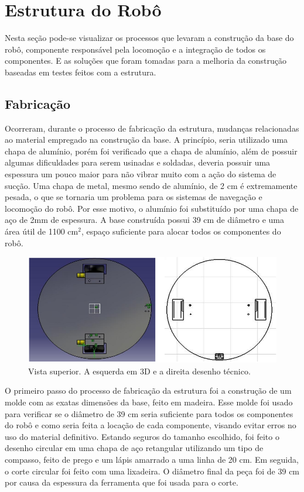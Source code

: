 
\section{Estrutura do Robô} %
\label{sec:estrutura_do_robô}

Nesta seção pode-se visualizar os processos que levaram a construção da base do robô, componente responsável pela locomoção e a integração de todos os componentes. E as soluções que foram tomadas para a melhoria da construção baseadas em testes feitos com a estrutura.

\subsection{Fabricação}

Ocorreram, durante o processo de fabricação da estrutura, mudanças relacionadas ao material empregado na construção da base. A princípio, seria utilizado uma chapa de alumínio, porém foi verificado que a chapa de alumínio, além de possuir algumas dificuldades para serem usinadas e soldadas, deveria possuir uma espessura um pouco maior para não vibrar muito com a ação do sistema de sucção. Uma chapa de metal, mesmo sendo de alumínio, de 2 cm é extremamente pesada, o que se tornaria um problema para os sistemas de navegação e locomoção do robô. Por esse motivo, o alumínio foi substituído por uma chapa de aço de 2mm de espessura. A base construída possui 39 cm de diâmetro e uma área útil de 1100 cm$^2$, espaço suficiente para alocar todos os componentes do robô.

\begin{figure}[H]
	\centering
	\includegraphics[scale=0.4]{figuras/vista_superior.png}
	\caption{Vista superior. A esquerda em 3D e a direita desenho técnico.}
	\label{img:vista_superior}
\end{figure}

O primeiro passo do processo de fabricação da estrutura foi a construção de um molde com as exatas dimensões da base, feito em madeira. Esse molde foi usado para verificar se o diâmetro de 39 cm seria suficiente para todos os componentes do robô e como seria feita a locação de cada componente, visando evitar erros no uso do material definitivo. Estando seguros do tamanho escolhido, foi feito o desenho circular em uma chapa de aço retangular utilizando um tipo de compasso, feito de prego e um lápis amarrado a uma linha de 20 cm. Em seguida, o corte circular foi feito com uma lixadeira. O diâmetro final da peça foi de 39 cm por causa da espessura da ferramenta que foi usada para o corte.

